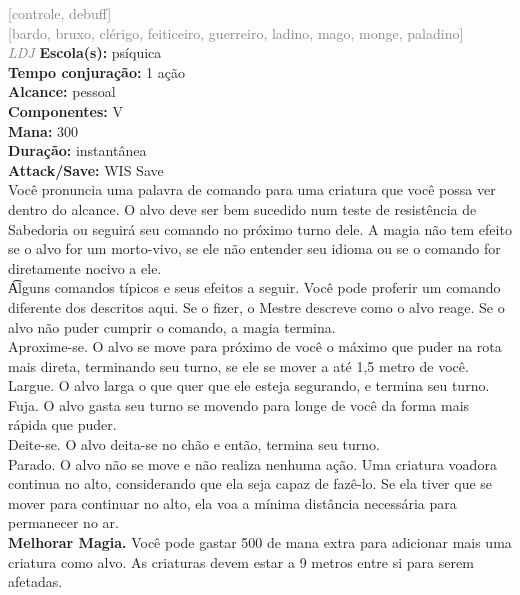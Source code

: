 \documentclass{RPG_Adventure}[2021/10/20]
\begin{document}
{\scriptsize \textcolor{gray}{[controle, debuff]\\}}
{\scriptsize \textcolor{gray}{[bardo, bruxo, clérigo, feiticeiro, guerreiro, ladino, mago, monge, paladino]\\}}
{\tiny \textcolor{gray}{\textit{LDJ}}}
{\small \t \textbf{Escola(s):} psíquica\\\t \textbf{Tempo conjuração:} 1 ação\\\t \textbf{Alcance:} pessoal\\\t \textbf{Componentes:} V\\\t \textbf{Mana:} 300\\\t \textbf{Duração:} instantânea\\\t \textbf{Attack/Save:} WIS Save\\}
{\normalsize Você pronuncia uma palavra de comando para uma criatura que você possa ver dentro do alcance. O alvo deve ser bem sucedido num teste de resistência de Sabedoria ou seguirá seu comando no próximo turno dele. A magia não tem efeito se o alvo for um morto-vivo, se ele não entender seu idioma ou se o comando for diretamente nocivo a ele.\\\t Alguns comandos típicos e seus efeitos a seguir. Você pode proferir um comando diferente dos descritos aqui. Se o fizer, o Mestre descreve como o alvo reage. Se o alvo não puder cumprir o comando, a magia termina. \\\t \textit{}Aproxime-se.\textit{} O alvo se move para próximo de você o máximo que puder na rota mais direta, terminando seu turno, se ele se mover a até 1,5 metro de você.\\\t \textit{}Largue.\textit{} O alvo larga o que quer que ele esteja segurando, e termina seu turno.\\\t \textit{}Fuja.\textit{} O alvo gasta seu turno se movendo para longe de você da forma mais rápida que puder.\\\t \textit{}Deite-se.\textit{} O alvo deita-se no chão e então, termina seu turno.\\\t \textit{}Parado.\textit{} O alvo não se move e não realiza nenhuma ação. Uma criatura voadora continua no alto, considerando que ela seja capaz de fazê-lo. Se ela tiver que se mover para continuar no alto, ela voa a mínima distância necessária para permanecer no ar.\\\t \textbf{Melhorar Magia.} Você pode gastar 500 de mana extra para adicionar mais uma criatura como alvo. As criaturas devem estar a 9 metros entre si para serem afetadas.\\}
\end{document}

